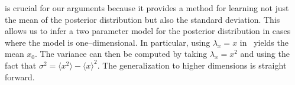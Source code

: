 \documentclass[aps,amsmath,onecolumn,amssymb,notitlepage]{revtex4-1}
\begin{document}
 is crucial for our arguments because it provides a method for learning not just the mean of the posterior distribution but also the standard deviation.  This allows us to infer a two parameter model for the posterior distribution in cases where the model is one--dimensional.
In particular, using $\lambda_x = x$ in~ yields the mean $x_0$.  The variance can then be computed by taking $\lambda_x = x^2$ and using the fact that $\sigma^2 = \langle x^2\rangle-\langle x\rangle^2$.  The generalization to higher dimensions is straight forward.  


\end{document}
